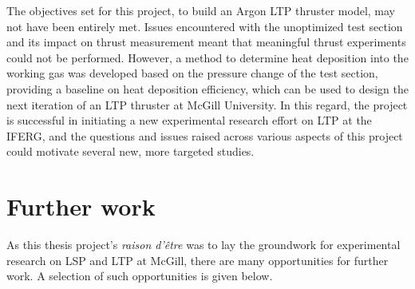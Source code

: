     The objectives set for this project, to build an Argon LTP thruster model, may not have been entirely met. Issues encountered with the unoptimized test section and its impact on thrust measurement meant that meaningful thrust experiments could not be performed. However, a method to determine heat deposition into the working gas was developed based on the pressure change of the test section, providing a baseline on heat deposition efficiency, which can be used to design the next iteration of an LTP thruster at McGill University. In this regard, the project is successful in initiating a new experimental research effort on LTP at the IFERG, and the questions and issues raised across various aspects of this project could motivate several new, more targeted studies.

    \section{Further work}
        As this thesis project's \emph{raison d'être} was to lay the groundwork for experimental research on LSP and LTP at McGill, there are many opportunities for further work. A selection of such opportunities is given below.

